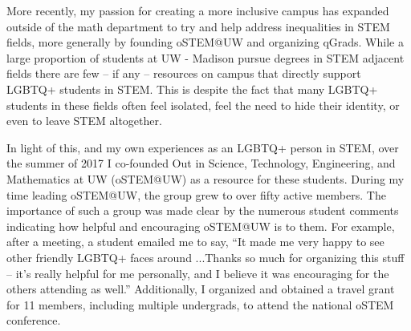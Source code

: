 \documentclass[11pt]{article}
\begin{document}
More recently, my passion for creating a more inclusive campus has expanded outside of the math department to try and help address inequalities in STEM fields, more generally by founding oSTEM@UW and organizing qGrads. While a large proportion of students at UW - Madison pursue degrees in STEM adjacent fields there are few -- if any -- resources on campus that directly support LGBTQ+ students in STEM. This is despite the fact that many LGBTQ+ students in these fields often feel isolated, feel the need to hide their identity, or even to leave STEM altogether.

In light of this, and my own experiences as an LGBTQ+ person in STEM, over the summer of 2017 I co-founded Out in Science, Technology, Engineering, and Mathematics at UW (oSTEM@UW) as a resource for these students. During my time leading oSTEM@UW, the group grew to over fifty active members. The importance of such a group was made clear by the numerous student comments indicating how helpful and encouraging oSTEM@UW is to them. For example, after a meeting, a student emailed me to say, ``It made me very happy to see other friendly LGBTQ+ faces around ...Thanks so much for organizing this stuff -- it's really helpful for me personally, and I believe it was encouraging for the others attending as well.'' Additionally, I organized and obtained a travel grant for 11 members, including multiple undergrads, to attend the national oSTEM conference. 

\end{document}
